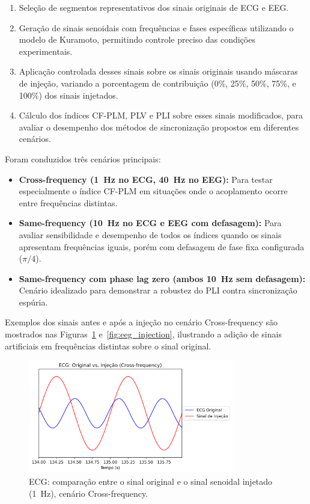 \begin{enumerate}
    \item Seleção de segmentos representativos dos sinais originais de ECG e EEG.
    \item Geração de sinais senoidais com frequências e fases específicas utilizando o modelo de Kuramoto, permitindo controle preciso das condições experimentais.
    \item Aplicação controlada desses sinais sobre os sinais originais usando máscaras de injeção, variando a porcentagem de contribuição (0\%, 25\%, 50\%, 75\%, e 100\%) dos sinais injetados.
    \item Cálculo dos índices CF-PLM, PLV e PLI sobre esses sinais modificados, para avaliar o desempenho dos métodos de sincronização propostos em diferentes cenários.
\end{enumerate}

Foram conduzidos três cenários principais:

\begin{itemize}
    \item \textbf{Cross-frequency (1~Hz no ECG, 40~Hz no EEG):} Para testar especialmente o índice CF-PLM em situações onde o acoplamento ocorre entre frequências distintas.
    \item \textbf{Same-frequency (10~Hz no ECG e EEG com defasagem):} Para avaliar sensibilidade e desempenho de todos os índices quando os sinais apresentam frequências iguais, porém com defasagem de fase fixa configurada (\(\pi/4\)).
    \item \textbf{Same-frequency com phase lag zero (ambos 10~Hz sem defasagem):} Cenário idealizado para demonstrar a robustez do PLI contra sincronização espúria.
\end{itemize}

Exemplos dos sinais antes e após a injeção no cenário Cross-frequency são mostrados nas Figuras~\ref{fig:ecg_injection} e~\ref{fig:eeg_injection}, ilustrando a adição de sinais artificiais em frequências distintas sobre o sinal original.

\begin{figure}[htb]
    \centering
    \includegraphics[width=0.8\textwidth]{figs/3_2_testing_connectivity_metrics/1_ECG_Original_vs_Injecao_Cross-frequency.png}
    \caption{ECG: comparação entre o sinal original e o sinal senoidal injetado (1~Hz), cenário Cross-frequency.}
    \label{fig:ecg_injection}
\end{figure}

